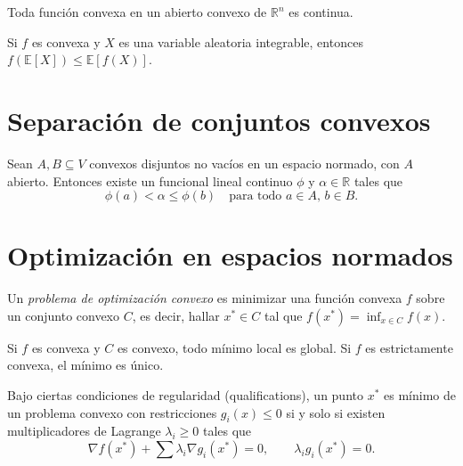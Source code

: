 \begin{proposition}
\label{prop:convexa-continua}
Toda función convexa en un abierto convexo de $\mathbb{R}^n$ es continua.
\end{proposition}

\begin{theorem}
\label{teo:jensen}
Si $f$ es convexa y $X$ es una variable aleatoria integrable, entonces $f(\mathbb{E}[X])\leq\mathbb{E}[f(X)]$.
\end{theorem}

\section{Separación de conjuntos convexos}

\begin{theorem}
\label{teo:hahn-banach-convexo}
Sean $A,B\subseteq V$ convexos disjuntos no vacíos en un espacio normado, con $A$ abierto. Entonces existe un funcional lineal continuo $\phi$ y $\alpha\in\mathbb{R}$ tales que
\[
  \phi(a)<\alpha\leq\phi(b)\quad\text{para todo }a\in A,\,b\in B.
\]
\end{theorem}

\section{Optimización en espacios normados}

\begin{definition}
\label{def:problema-optimizacion}
Un \emph{problema de optimización convexo} es minimizar una función convexa $f$ sobre un conjunto convexo $C$, es decir, hallar $x^*\in C$ tal que $f(x^*)=\inf_{x\in C}f(x)$.
\end{definition}

\begin{theorem}
\label{teo:minimo-convexo}
Si $f$ es convexa y $C$ es convexo, todo mínimo local es global. Si $f$ es estrictamente convexa, el mínimo es único.
\end{theorem}

\begin{theorem}
\label{teo:kkt}
Bajo ciertas condiciones de regularidad (qualifications), un punto $x^*$ es mínimo de un problema convexo con restricciones $g_i(x)\leq 0$ si y solo si existen multiplicadores de Lagrange $\lambda_i\geq 0$ tales que
\[
  \nabla f(x^*)+\sum\lambda_i\nabla g_i(x^*)=0,\qquad \lambda_i g_i(x^*)=0.
\]
\end{theorem}

